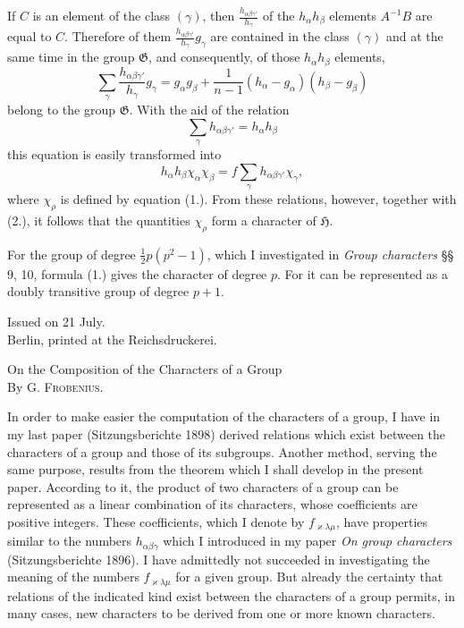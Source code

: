 \documentclass[11pt]{article}
\newcommand{\Hgr}{\mathfrak{H}}
\newcommand{\Ggr}{\mathfrak{G}}
\begin{document}
If $C$ is an element of the class $(\gamma)$, then $\frac{h_{\alpha\beta\gamma'}}{h_\gamma}$ of the $h_\alpha h_\beta$ elements $A^{-1}B$ are equal to $C$. Therefore of them $\frac{h_{\alpha\beta\gamma'}}{h_\gamma}g_\gamma$ are contained in the class $(\gamma)$ and at the same time in the group $\Ggr$, and consequently, of those $h_\alpha h_\beta$ elements,
\[
  \sum_\gamma \frac{h_{\alpha\beta\gamma'}}{h_\gamma}g_\gamma
  =
  g_\alpha g_\beta+\frac{1}{n-1}(h_\alpha-g_\alpha)(h_\beta-g_\beta)
\]
belong to the group $\Ggr$. With the aid of the relation
\[
  \sum_\gamma h_{\alpha\beta\gamma'}=h_\alpha h_\beta
\]
this equation is easily transformed into
\[
\tag{5.}
  h_\alpha h_\beta\chi_\alpha\chi_\beta
  =
  f\sum_\gamma h_{\alpha\beta\gamma'}\chi_\gamma,
\]
where $\chi_\rho$ is defined by equation (1.). From these relations, however, together with (2.), it follows that the quantities $\chi_\rho$ form a character of $\Hgr$.

For the group of degree $\frac12 p(p^2-1)$, which I investigated in \emph{Group characters} §§ 9, 10, formula (1.) gives the character of degree $p$. For it can be represented as a doubly transitive group of degree $p+1$.

\begin{center}
\small Issued on 21 July.\\[1.5em]
Berlin, printed at the Reichsdruckerei.
\end{center}

\clearpage

\begin{center}
{\Large On the Composition of the Characters of a Group}\\[0.75em]
By G. \textsc{Frobenius}.
\end{center}

In order to make easier the computation of the characters of a group, I have in my last paper (Sitzungsberichte 1898) derived relations which exist between the characters of a group and those of its subgroups. Another method, serving the same purpose, results from the theorem which I shall develop in the present paper. According to it, the product of two characters of a group can be represented as a linear combination of its characters, whose coefficients are positive integers. These coefficients, which I denote by $f_{\varkappa\lambda\mu}$, have properties similar to the numbers $h_{\alpha\beta\gamma}$ which I introduced in my paper \emph{On group characters} (Sitzungsberichte 1896). I have admittedly not succeeded in investigating the meaning of the numbers $f_{\varkappa\lambda\mu}$ for a given group. But already the certainty that relations of the indicated kind exist between the characters of a group permits, in many cases, new characters to be derived from one or more known characters.
\end{document}
